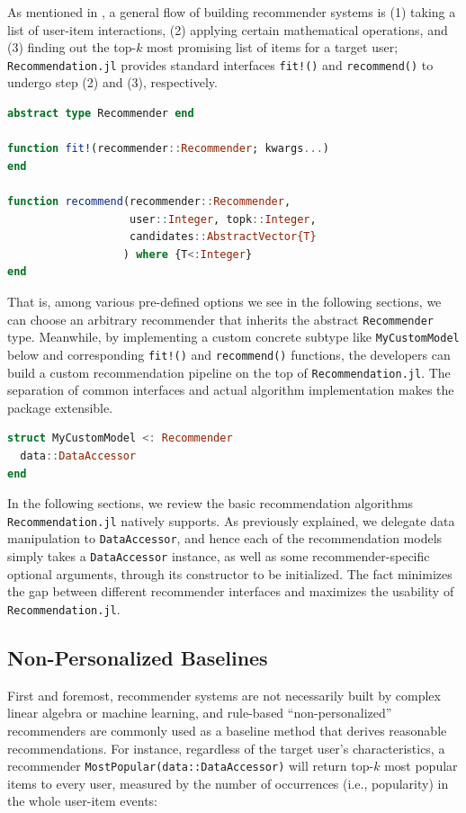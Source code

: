 As mentioned in , a general flow of building recommender systems is (1) taking a list of user-item interactions, (2) applying certain mathematical operations, and (3) finding out the top-$k$ most promising list of items for a target user; \texttt{Recommendation.jl} provides standard interfaces \texttt{fit!()} and \texttt{recommend()} to undergo step (2) and (3), respectively. 

\begin{lstlisting}[language = Julia]
abstract type Recommender end

function fit!(recommender::Recommender; kwargs...)
end

function recommend(recommender::Recommender, 
                   user::Integer, topk::Integer, 
                   candidates::AbstractVector{T}
                  ) where {T<:Integer}
end
\end{lstlisting}

That is, among various pre-defined options we see in the following sections, we can choose an arbitrary recommender that inherits the abstract \texttt{Recommender} type. Meanwhile, by implementing a custom concrete subtype like \texttt{MyCustomModel} below and corresponding \texttt{fit!()} and \texttt{recommend()} functions, the developers can build a custom recommendation pipeline on the top of \texttt{Recommendation.jl}. The separation of common interfaces and actual algorithm implementation makes the package extensible.

\begin{lstlisting}[language = Julia]
struct MyCustomModel <: Recommender 
  data::DataAccessor
end
\end{lstlisting}

In the following sections, we review the basic recommendation algorithms \texttt{Recommendation.jl} natively supports. As previously explained, we delegate data manipulation to \texttt{DataAccessor}, and hence each of the recommendation models simply takes a \texttt{DataAccessor} instance, as well as some recommender-specific optional arguments, through its constructor to be initialized. The fact minimizes the gap between different recommender interfaces and maximizes the usability of \texttt{Recommendation.jl}.

\subsection{Non-Personalized Baselines}

First and foremost, recommender systems are not necessarily built by complex linear algebra or machine learning, and rule-based ``non-personalized'' recommenders are commonly used as a baseline method that derives reasonable recommendations. For instance, regardless of the target user's characteristics, a recommender \texttt{MostPopular(data::DataAccessor)} will return top-$k$ most popular items to every user, measured by the number of occurrences (i.e., popularity) in the whole user-item events:

